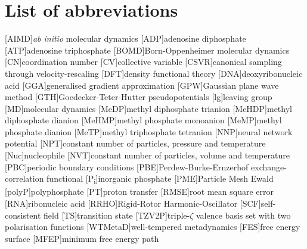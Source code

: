 \chapter*{List of abbreviations}

\begin{acronym}
    [AIMD]{\textit{ab initio} molecular dynamics}
    [ADP]{adenosine diphosphate}
    [ATP]{adenosine triphosphate}
    [BOMD]{Born-Oppenheimer molecular dynamics}
    [CN]{coordination number}
    [CV]{collective variable}
    [CSVR]{canonical sampling through velocity-rescaling}
    [DFT]{density functional theory}
    [DNA]{deoxyribonucleic acid}
    [GGA]{generalised gradient approximation}
    [GPW]{Gaussian plane wave method}
    [GTH]{Goedecker-Teter-Hutter pseudopotentials}
    [lg]{leaving group}
    [MD]{molecular dynamics}
    [MeDP]{methyl diphosphate trianion}
    [MeHDP]{methyl diphosphate dianion}
    [MeHMP]{methyl phosphate monoanion}
    [MeMP]{methyl phosphate dianion}
    [MeTP]{methyl triphosphate tetranion}
    [NNP]{neural network potential}
    [NPT]{constant number of particles, pressure and temperature}
    [Nuc]{nucleophile}
    [NVT]{constant number of particles, volume and temperature}
    [PBC]{periodic boundary conditions}
    [PBE]{Perdew-Burke-Ernzerhof exchange-correlation functional}
    [P\textsubscript{i}]{inorganic phosphate}
    [PME]{Particle Mesh Ewald}
    [polyP]{polyphosphate}
    [PT]{proton transfer}
    [RMSE]{root mean square error}
    [RNA]{ribonucleic acid}
    [RRHO]{Rigid-Rotor Harmonic-Oscillator}
    [SCF]{self-consistent field}
    [TS]{transition state}
    [TZV2P]{triple-$\zeta$ valence basis set with two polarisation functions}
    [WTMetaD]{well-tempered metadynamics}
    [FES]{free energy surface}
    [MFEP]{minimum free energy path}
\end{acronym}


